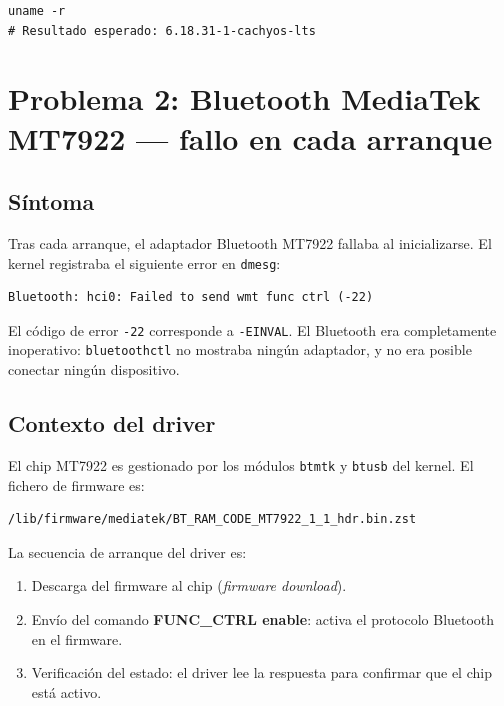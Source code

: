 \documentclass[12pt,a4paper]{article}
\begin{document}
\begin{lstlisting}[style=bash]
uname -r
# Resultado esperado: 6.18.31-1-cachyos-lts
\end{lstlisting}

\section{Problema 2: Bluetooth MediaTek MT7922 --- fallo en cada arranque}

\subsection{Síntoma}

Tras cada arranque, el adaptador Bluetooth MT7922 fallaba al inicializarse.
El kernel registraba el siguiente error en \texttt{dmesg}:

\begin{lstlisting}[style=bash]
Bluetooth: hci0: Failed to send wmt func ctrl (-22)
\end{lstlisting}

El código de error \texttt{-22} corresponde a \texttt{-EINVAL}. El Bluetooth
era completamente inoperativo: \texttt{bluetoothctl} no mostraba ningún
adaptador, y no era posible conectar ningún dispositivo.

\subsection{Contexto del driver}

El chip MT7922 es gestionado por los módulos \texttt{btmtk} y \texttt{btusb}
del kernel. El fichero de firmware es:

\begin{lstlisting}[style=bash]
/lib/firmware/mediatek/BT_RAM_CODE_MT7922_1_1_hdr.bin.zst
\end{lstlisting}

La secuencia de arranque del driver es:
\begin{enumerate}
  \item Descarga del firmware al chip (\emph{firmware download}).
  \item Envío del comando \textbf{FUNC\_CTRL enable}: activa el protocolo
        Bluetooth en el firmware.
  \item Verificación del estado: el driver lee la respuesta para confirmar
        que el chip está activo.
\end{enumerate}
\end{document}
